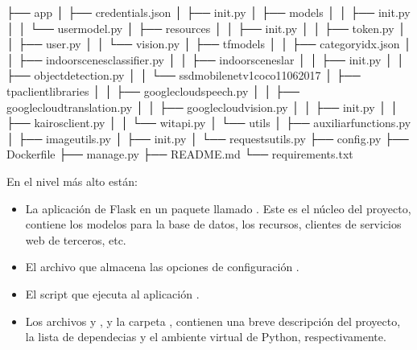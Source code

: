 \begin{sphinxVerbatim}[commandchars=\\\{\}]
├── app
│   ├── credentials.json
│   ├── \PYGZus{}\PYGZus{}init\PYGZus{}\PYGZus{}.py
│   ├── models
│   │   ├── \PYGZus{}\PYGZus{}init\PYGZus{}\PYGZus{}.py
│   │   └── user\PYGZus{}model.py
│   ├── resources
│   │   ├── \PYGZus{}\PYGZus{}init\PYGZus{}\PYGZus{}.py
│   │   ├── token.py
│   │   ├── user.py
│   │   └── vision.py
│   ├── tf\PYGZus{}models
│   │   ├── category\PYGZus{}idx.json
│   │   ├── indoor\PYGZus{}scenes\PYGZus{}classifier.py
│   │   ├── indoor\PYGZus{}scenes\PYGZus{}lar
│   │   ├── \PYGZus{}\PYGZus{}init\PYGZus{}\PYGZus{}.py
│   │   ├── object\PYGZus{}detection.py
│   │   └── ssd\PYGZus{}mobilenet\PYGZus{}v1\PYGZus{}coco\PYGZus{}11\PYGZus{}06\PYGZus{}2017
│   ├── tpa\PYGZus{}client\PYGZus{}libraries
│   │   ├── google\PYGZus{}cloud\PYGZus{}speech.py
│   │   ├── google\PYGZus{}cloud\PYGZus{}translation.py
│   │   ├── google\PYGZus{}cloud\PYGZus{}vision.py
│   │   ├── \PYGZus{}\PYGZus{}init\PYGZus{}\PYGZus{}.py
│   │   ├── kairos\PYGZus{}client.py
│   │   └── wit\PYGZus{}api.py
│   └── utils
│       ├── auxiliar\PYGZus{}functions.py
│       ├── image\PYGZus{}utils.py
│       ├── \PYGZus{}\PYGZus{}init\PYGZus{}\PYGZus{}.py
│       └── requests\PYGZus{}utils.py
├── config.py
├── Dockerfile
├── manage.py
├── README.md
└── requirements.txt
\end{sphinxVerbatim}

En el nivel más alto están:
\begin{itemize}
\item {} 
La aplicación de Flask en un paquete llamado . Este es el núcleo del proyecto, contiene los modelos para la base de datos, los recursos, clientes de servicios web de terceros, etc.

\item {} 
El archivo que almacena las opciones de configuración .

\item {} 
El script que ejecuta al aplicación .

\item {} 
Los archivos  y , y la carpeta , contienen una breve descripción del proyecto, la lista de dependecias y el ambiente virtual de Python, respectivamente.

\end{itemize}

